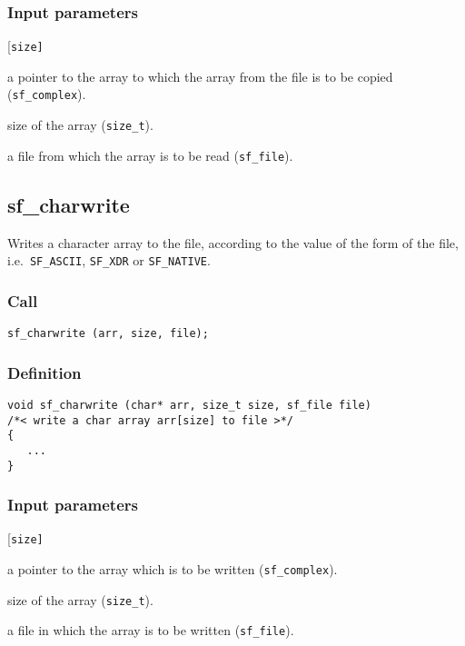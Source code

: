 \subsubsection*{Input parameters}
\begin{desclist}{\tt }{\quad}[\tt size]
   \setlength\itemsep{0pt}
   \item[arr] a pointer to the array to which the array from the file is to be copied (\texttt{sf\_complex}). 
   \item[size] size of the array (\texttt{size\_t}). 
   \item[file] a file from which the array is to be read (\texttt{sf\_file}).
\end{desclist}




\subsection{{sf\_charwrite}}
Writes a character array to the file, according to the value of the form of the file, i.e.~\texttt{SF\_ASCII}, \texttt{SF\_XDR} or \texttt{SF\_NATIVE}.    

\subsubsection*{Call}
\begin{verbatim}sf_charwrite (arr, size, file);\end{verbatim}

\subsubsection*{Definition}
\begin{verbatim}
void sf_charwrite (char* arr, size_t size, sf_file file)
/*< write a char array arr[size] to file >*/
{
   ...
}
\end{verbatim}

\subsubsection*{Input parameters}
\begin{desclist}{\tt }{\quad}[\tt size]
   \setlength\itemsep{0pt}
   \item[arr]  a pointer to the array which is to be written (\texttt{sf\_complex}). 
   \item[size] size of the array (\texttt{size\_t}). 
   \item[file] a file in which the array is to be written (\texttt{sf\_file}).
\end{desclist}




